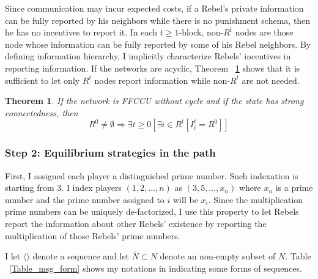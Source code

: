 \documentclass[12pt,letterpaper]{article}
\newtheorem{theorem}{Theorem}
\theoremstyle{definition}
\theoremstyle{remark}
\theoremstyle{claim}
\begin{document}
Since communication may incur expected costs, if a Rebel's private information can be fully reported by his neighbors while there is no punishment schema, then he has no incentives to report it. In each $t\geq 1$-block, non-$R^t$ nodes are those node whose information can be fully reported by some of his Rebel neighbors. By defining information hierarchy, I implicitly characterize Rebels' incentives in reporting information. If the networks are acyclic, Theorem ~\ref{lemma_empty} shows that it is sufficient to let only $R^t$ nodes report information while non-$R^t$ are not needed. 
\begin{theorem}
\label{lemma_empty}
If the network is FFCCU without cycle and if the state has strong connectedness, then 
\[R^0\neq \emptyset \Rightarrow \exists t\geq 0[\exists i\in R^t[I^t_i=R^0]]\]
\end{theorem}



\subsubsection{Step 2: Equilibrium strategies in the path}


First, I assigned each player a distinguished prime number. Such indexation is starting from $3$. I index players $(1,2,...,n)$ as $(3,5,...,x_n)$ where $x_n$ is a prime number and the prime number assigned to $i$ will be $x_i$. Since the multiplication prime numbers can be uniquely de-factorized, I use this property to let Rebels report the information about other Rebels' existence by reporting the multiplication of those Rebels' prime numbers.

I let $\langle\rangle$ denote a sequence and let $\bar{N}\subset N$ denote an non-empty subset of $N$. Table ~\ref{Table_msg_form} shows my notations in indicating some forms of sequences. 
\end{document}
